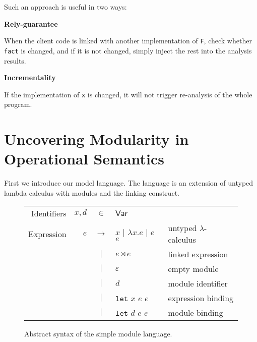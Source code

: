 \documentclass[acmsmall,screen,review]{acmart}\settopmatter{printfolios=true,printccs=false,printacmref=false}
\theoremstyle{acmdefinition}
\newcommand*{\vbar}{|}
\newcommand*{\ExprVar}{\mathsf{Var}}
\newcommand*{\modid}{d}
\newcommand*{\link}[2]{{#1}\rtimes{#2}}
\newcommand*{\Let}{\mathtt{let}}
\begin{document}
Such an approach is useful in two ways:

\noindent\textbf{Rely-guarantee}

When the client code is linked with another implementation of \texttt{F}, check whether \texttt{fact} is changed, and if it is not changed, simply inject the rest into the analysis results.

\noindent\textbf{Incrementality}

If the implementation of \texttt{x} is changed, it will not trigger re-analysis of the whole program.

\section{Uncovering Modularity in Operational Semantics}
First we introduce our model language.
The language is an extension of untyped lambda calculus with modules and the linking construct.
\begin{figure}[h!]
  \footnotesize
  \centering
  \begin{tabular}{rrcll}
    Identifiers & $x,\modid$ & $\in$         & $\ExprVar$                                                             \\
    Expression  & $e$        & $\rightarrow$ & $x$ $\vbar$ $\lambda x.e$ $\vbar$ $e$ $e$ & untyped $\lambda$-calculus \\
                &            & $\vbar$       & $\link{e}{e}$                             & linked expression          \\
                &            & $\vbar$       & $\varepsilon$                             & empty module               \\
                &            & $\vbar$       & $\modid$                                  & module identifier          \\
                &            & $\vbar$       & $\Let$ $x$ $e$ $e$                        & expression binding         \\
                &            & $\vbar$       & $\Let$ $\modid$ $e$ $e$                   & module binding             \\
  \end{tabular}
  \caption{Abstract syntax of the simple module language.}
  \label{fig:syntax}
\end{figure}
\end{document}
